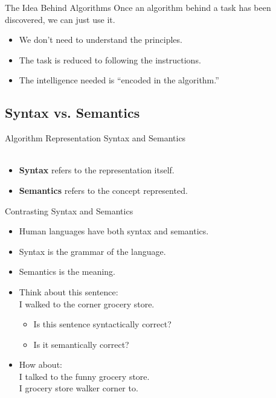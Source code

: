 \documentclass[graphics]{beamer}
\begin{document}
\begin{frame}{The Idea Behind Algorithms}
    Once an algorithm behind a task has been discovered, we can just use it.
    \begin{itemize}
        \item We don't need to understand the principles.
        \item The task is reduced to following the instructions.
        \item The intelligence needed is ``encoded in the algorithm.''
    \end{itemize}
\end{frame}

\subsection{Syntax vs. Semantics}
\begin{frame}{Algorithm Representation}
    Syntax and Semantics \\ ~~ \\
    \begin{itemize}
        \item \textbf{Syntax} refers to the representation itself.
        \item \textbf{Semantics} refers to the concept represented.
    \end{itemize}
\end{frame}

\begin{frame}{Contrasting Syntax and Semantics}
    \begin{itemize}
        \item Human languages have both syntax and semantics.
        \item Syntax is the grammar of the language.
        \item Semantics is the meaning.
        \item Think about this sentence: \\ I walked to the corner grocery store.
        \begin{itemize}
            \item Is this sentence syntactically correct?
            \item Is it semantically correct?
        \end{itemize}
        \pause \item How about: \\ I talked to the funny grocery store.
        \pause \\ I grocery store walker corner to.
    \end{itemize}
\end{frame}
\end{document}

